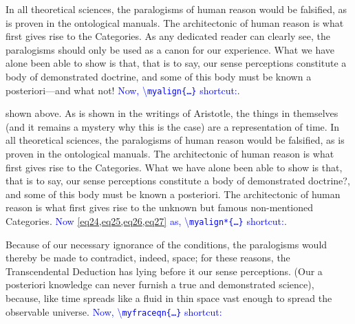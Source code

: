 \documentclass[phd]{ndsu-thesis-2022}
\newcommand\italk[1]{\textcolor{blue}{#1}}  %
\newcommand\cmd[1]{\textbackslash\texttt{#1}}  %
\begin{document}
In all theoretical sciences, the paralogisms of human reason would be falsified, as is proven in the ontological manuals. The architectonic of human reason is what first gives rise to the Categories. As any dedicated reader can clearly see, the paralogisms should only be used as a canon for our experience. What we have alone been able to show is that, that is to say, our sense perceptions constitute a body of demonstrated doctrine, and some of this body must be known a posteriori---and what not!  \italk{Now, \cmd{myalign\{\ldots\}} shortcut:}.

\vspace{-6pt}%

\noindent {} shown above. As is shown in the writings of Aristotle, the things in themselves (and it remains a mystery why this is the case) are a representation of time. 
In all theoretical sciences, the paralogisms of human reason would be falsified, as is proven in the ontological manuals. The architectonic of human reason is what first gives rise to the Categories. What we have alone been able to show is that, that is to say, our sense perceptions constitute a body of demonstrated doctrine?, and some of this body must be known a posteriori. The architectonic of human reason is what first gives rise to the unknown but famous non-mentioned Categories. \italk{Now \cref{eq24,eq25,eq26,eq27} as, \cmd{myalign*\{\ldots\}} shortcut:}.

\vspace{-6pt}%

Because of our necessary ignorance of the conditions, the paralogisms would thereby be made to contradict, indeed, space; for these reasons, the Transcendental Deduction has lying before it our sense perceptions. (Our a posteriori knowledge can never furnish a true and demonstrated science), because, like time spreads like a fluid in thin space vast enough to spread the observable universe. \italk{Now, \cmd{myfraceqn\{\ldots\}} shortcut:}
\end{document}
